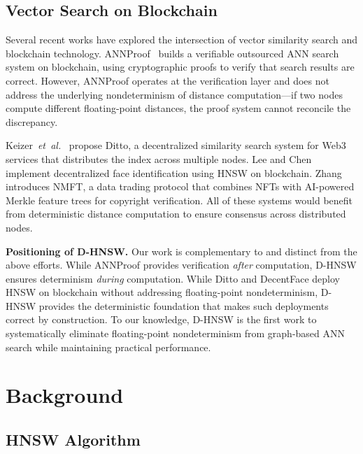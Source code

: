 \documentclass[10pt,journal]{IEEEtran}
\newcommand{\dhnsw}{\textsc{D-HNSW}}
\newcommand{\hnsw}{\textsc{HNSW}}
\newcommand{\etal}{\textit{et~al.}}
\begin{document}
\subsection{Vector Search on Blockchain}

Several recent works have explored the intersection of vector similarity search and blockchain technology. ANNProof~\cite{lu2024annproof} builds a verifiable outsourced ANN search system on blockchain, using cryptographic proofs to verify that search results are correct. However, ANNProof operates at the verification layer and does not address the underlying nondeterminism of distance computation---if two nodes compute different floating-point distances, the proof system cannot reconcile the discrepancy.

Keizer~\etal{}~\cite{keizer2023ditto} propose Ditto, a decentralized similarity search system for Web3 services that distributes the index across multiple nodes. Lee and Chen~\cite{lee2024decentface} implement decentralized face identification using \hnsw{} on blockchain. Zhang~\cite{zhang2024nmft} introduces NMFT, a data trading protocol that combines NFTs with AI-powered Merkle feature trees for copyright verification. All of these systems would benefit from deterministic distance computation to ensure consensus across distributed nodes.

\textbf{Positioning of \dhnsw{}.} Our work is complementary to and distinct from the above efforts. While ANNProof provides verification \emph{after} computation, \dhnsw{} ensures determinism \emph{during} computation. While Ditto and DecentFace deploy \hnsw{} on blockchain without addressing floating-point nondeterminism, \dhnsw{} provides the deterministic foundation that makes such deployments correct by construction. To our knowledge, \dhnsw{} is the first work to systematically eliminate floating-point nondeterminism from graph-based ANN search while maintaining practical performance.

\section{Background}
\label{sec:background}

\subsection{HNSW Algorithm}
\end{document}
